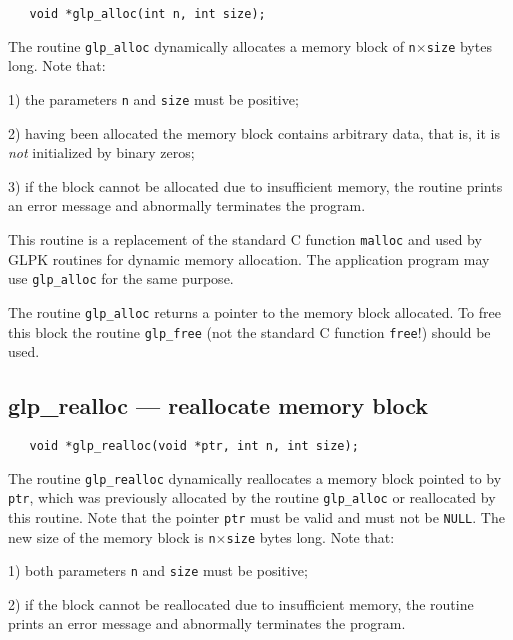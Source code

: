 \synopsis

\begin{verbatim}
   void *glp_alloc(int n, int size);
\end{verbatim}

\description

The routine \verb|glp_alloc| dynamically allocates a memory block of
\verb|n|$\times$\verb|size| bytes long. Note that:

1) the parameters \verb|n| and \verb|size| must be positive;

2) having been allocated the memory block contains arbitrary data, that
is, it is {\it not} initialized by binary zeros;

3) if the block cannot be allocated due to insufficient memory, the
routine prints an error message and abnormally terminates the program.

This routine is a replacement of the standard C function \verb|malloc|
and used by GLPK routines for dynamic memory allocation. The
application program may use \verb|glp_alloc| for the same purpose.

\returns

The routine \verb|glp_alloc| returns a pointer to the memory block
allocated. To free this block the routine \verb|glp_free| (not the
standard C function \verb|free|!) should be used.

\subsection{glp\_realloc --- reallocate memory block}

\synopsis

\begin{verbatim}
   void *glp_realloc(void *ptr, int n, int size);
\end{verbatim}

\description

The routine \verb|glp_realloc| dynamically reallocates a memory block
pointed to by \verb|ptr|, which was previously allocated by the routine
\verb|glp_alloc| or reallocated by this routine. Note that the pointer
\verb|ptr| must be valid and must not be \verb|NULL|. The new size of
the memory block is \verb|n|$\times$\verb|size| bytes long. Note that:

1) both parameters \verb|n| and \verb|size| must be positive;

2) if the block cannot be reallocated due to insufficient memory, the
routine prints an error message and abnormally terminates the program.

